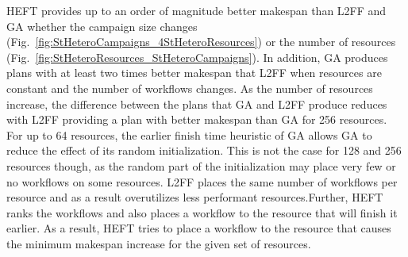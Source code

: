 HEFT provides up to an order of magnitude better makespan than L2FF and GA
whether the campaign size changes
(Fig.~\ref{fig:StHeteroCampaigns_4StHeteroResources}) or the number of
resources (Fig.~\ref{fig:StHeteroResources_StHeteroCampaigns}). In addition,
GA produces plans with at least two times better makespan that L2FF when
resources are constant and the number of workflows changes. As the number of
resources increase, the difference between the plans that GA and L2FF produce
reduces with L2FF providing a plan with better makespan than GA for 256
resources. For up to 64 resources, the earlier finish time heuristic of GA
allows GA to reduce the effect of its random initialization. This is not the
case for 128 and 256 resources though, as the random part of the
initialization may place very few or no workflows on some resources. L2FF
places the same number of workflows per resource and as a result overutilizes
less performant resources.Further, HEFT ranks the workflows and also places a
workflow to the resource that will finish it earlier. As a result, HEFT tries
to place a workflow to the resource that causes the minimum makespan increase
for the given set of resources.

